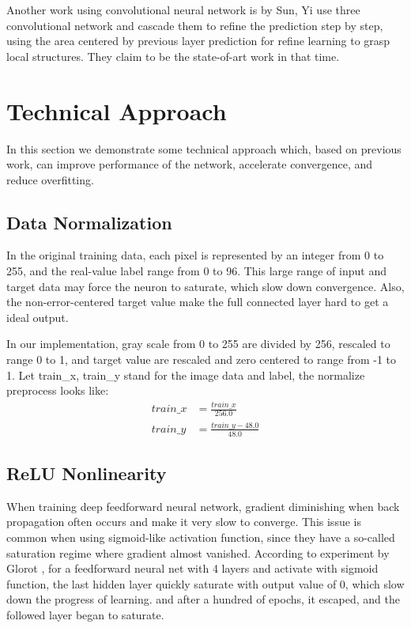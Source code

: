 \documentclass[10pt,twocolumn,letterpaper]{article}
\begin{document}
Another work using convolutional neural network is by Sun, Yi\cite{sun2013deep} use three
convolutional network and cascade them to refine the prediction step by step, using the area
centered by previous layer prediction for refine learning to grasp local structures. They claim to
be the state-of-art work in that time.

\section{Technical Approach}
In this section we demonstrate some technical approach which, based on previous
work, can improve performance of the network, accelerate convergence, and reduce
overfitting.

\subsection{Data Normalization}
In the original training data, each pixel is represented by an integer from 0 to 255,
and the real-value label range from 0 to 96. This large range of input and target data
may force the neuron to saturate, which slow down convergence. Also, the non-error-centered
target value make the full connected layer hard to get a ideal output.

In our implementation, gray scale from 0 to 255 are divided by 256, rescaled to range 0 to 1,
and target value are rescaled and zero centered to range from -1 to 1. Let train\_x, train\_y
stand for the image data and label, the normalize preprocess looks like:
$$
	\begin{aligned}
		train\_x &= \frac{train\_x}{256.0} \\
		train\_y &= \frac{train\_y - 48.0}{48.0}
	\end{aligned}
$$

\subsection{ReLU Nonlinearity}
When training deep feedforward neural network, gradient diminishing when back propagation
often occurs and make it very slow to converge. This issue is common when using sigmoid-like
activation function, since they have a so-called saturation regime where gradient almost vanished.
According to experiment by Glorot \cite{glorot2010understanding}, for a feedforward neural net
with 4 layers and activate with sigmoid function, the last hidden layer quickly saturate with
output value of 0, which slow down the progress of learning. and after a hundred of epochs,
it escaped, and the followed layer began to saturate.
\end{document}
